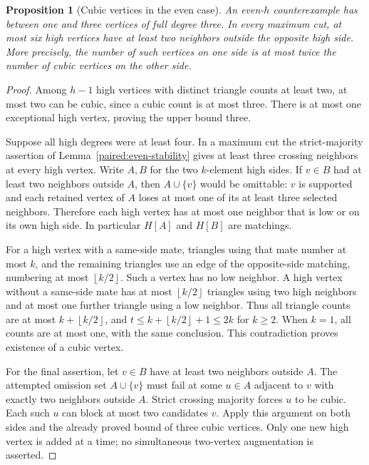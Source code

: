 \documentclass[11pt,a4paper]{article}
\newtheorem{proposition}[theorem]{Proposition}
\theoremstyle{definition}\newtheorem{definition}[theorem]{Definition}
\theoremstyle{remark}\newtheorem{remark}[theorem]{Remark}
\newcommand{\floor}[1]{\left\lfloor#1\right\rfloor}
\begin{document}
\begin{proposition}[Cubic vertices in the even case]\label{paired:cubic-filter}
An even-$h$ counterexample has between one and three vertices of full
degree three. In every maximum cut, at most six high vertices have
at least two neighbors outside the opposite high side. More precisely,
the number of such vertices on one side is at most twice the number
of cubic vertices on the other side.
\end{proposition}
\begin{proof}
Among $h-1$ high vertices with distinct triangle counts at least two,
at most two can be cubic, since a cubic count is at most three. There
is at most one exceptional high vertex, proving the upper bound three.

Suppose all high degrees were at least four. In a maximum cut the
strict-majority assertion of Lemma~\ref{paired:even-stability} gives
at least three crossing neighbors at every high vertex. Write $A,B$
for the two $k$-element high sides. If $v\in B$ had at least two
neighbors outside $A$, then $A\cup\{v\}$ would be omittable: $v$ is
supported and each retained vertex of $A$ loses at most one of its
at least three selected neighbors. Therefore each high vertex has
at most one neighbor that is low or on its own high side. In
particular $H[A]$ and $H[B]$ are matchings.

For a high vertex with a same-side mate, triangles using that mate
number at most $k$, and the remaining triangles use an edge of the
opposite-side matching, numbering at most $\floor{k/2}$. Such a vertex
has no low neighbor. A high vertex without a same-side mate has at
most $\floor{k/2}$ triangles using two high neighbors and at most
one further triangle using a low neighbor. Thus all triangle counts
are at most $k+\floor{k/2}$, and
$t\le k+\floor{k/2}+1\le2k$ for $k\ge2$. When $k=1$, all counts
are at most one, with the same conclusion. This contradiction proves
existence of a cubic vertex.

For the final assertion, let $v\in B$ have at least two neighbors
outside $A$. The attempted omission set $A\cup\{v\}$ must fail at
some $u\in A$ adjacent to $v$ with exactly two neighbors outside $A$.
Strict crossing majority forces $u$ to be cubic. Each such $u$ can
block at most two candidates $v$. Apply this argument on both sides
and the already proved bound of three cubic vertices. Only one new
high vertex is added at a time; no simultaneous two-vertex augmentation
is asserted.
\end{proof}
\end{document}
